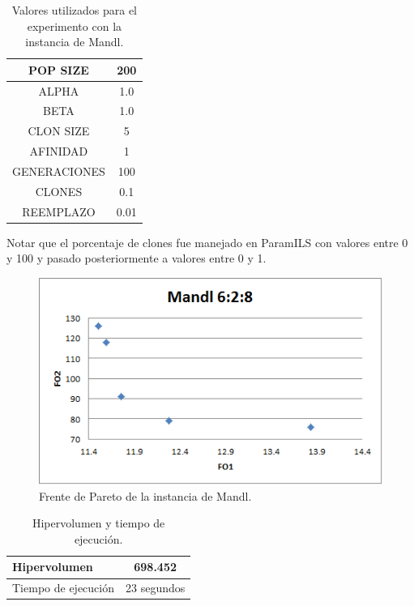 \documentclass{llncs}
\begin{document}
\begin{table}[!htb]
\begin{center}
\begin{tabular}{|c|c|}
\hline
POP SIZE & 200\\ \hline
ALPHA & 1.0\\ \hline
BETA & 1.0\\ \hline
CLON SIZE & 5\\ \hline
AFINIDAD & 1\\ \hline
GENERACIONES & 100\\ \hline
CLONES & 0.1\\ \hline
REEMPLAZO & 0.01\\ \hline
\end{tabular}
\caption{Valores utilizados para el experimento con la instancia de Mandl.}
\end{center}
\end{table}

Notar que el porcentaje de clones fue manejado en ParamILS con valores entre 0 y 100 y pasado posteriormente a valores entre 0 y 1.

\begin{figure}[!htb]
\begin{center}
\includegraphics[scale=0.7]{pareto_mandl.png}
\caption{Frente de Pareto de la instancia de Mandl.}
\label{fig:pareto_mandl}
\end{center}
\end{figure}

\begin{table}[!htb]
\begin{center}
\begin{tabular}{|l|c|}
\hline
Hipervolumen & 698.452\\ \hline
Tiempo de ejecución & 23 segundos\\ \hline
\end{tabular}
\caption{Hipervolumen y tiempo de ejecución.}
\label{tab:mandldata}
\end{center}
\end{table}
\end{document}
